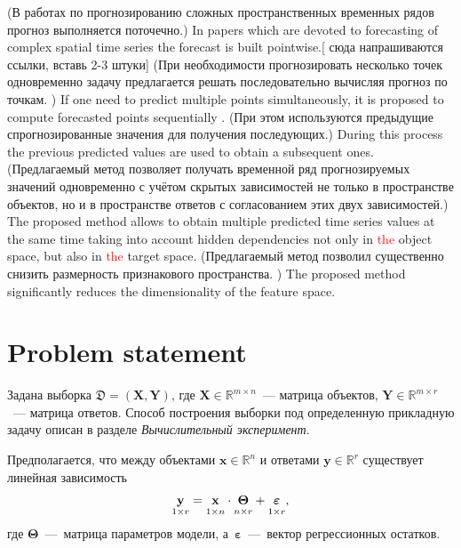 \documentclass[12pt,twoside]{article}
\newcommand{\bx}{\mathbf{x}}
\newcommand{\by}{\mathbf{y}}
\newcommand{\bY}{\mathbf{Y}}
\newcommand{\bX}{\mathbf{X}}
\newcommand{\bTheta}{\boldsymbol{\Theta}}
\begin{document}
(В работах по прогнозированию сложных пространственных временных рядов прогноз выполняется поточечно.)
In papers which are devoted to forecasting of complex spatial time series the forecast is built pointwise.[{\color{red} сюда напрашиваются ссылки, вставь 2-3 штуки}]
(При необходимости прогнозировать несколько точек одновременно задачу предлагается решать последовательно вычисляя прогноз по точкам. )
If one need to predict multiple points simultaneously, it is proposed to compute forecasted points sequentially .
(При этом используются предыдущие спрогнозированные значения для получения последующих.)
During this process the previous predicted values are used to obtain a subsequent ones.
(Предлагаемый метод позволяет получать временной ряд прогнозируемых значений одновременно с учётом скрытых зависимостей не только в пространстве объектов, но и в пространстве ответов с согласованием этих двух зависимостей.)
The proposed method allows to obtain multiple predicted time series values at the same time taking into account hidden dependencies not only in \textcolor{red}{the} object space, but also in \textcolor{red}{the} target space.
(Предлагаемый метод позволил существенно снизить размерность признакового пространства. )
The proposed method significantly reduces the dimensionality of the feature space.
 

\section{Problem statement}
Задана выборка $\mathfrak{D}= \left( \bX, \bY \right)$, где $\mathbf{X} \in \mathbb{R}^{m \times n}$~--- матрица объектов, $\mathbf{Y} \in \mathbb{R}^{m \times r}$~--- матрица ответов. 
Способ построения выборки под определенную прикладную задачу описан в разделе \textit{Вычислительный эксперимент}.

Предполагается, что между объектами $\bx \in \mathbb{R}^n$ и ответами $\by \in \mathbb{R}^r$ существует линейная зависимость 
\begin{equation}
 \underset{1 \times r}{\by} = \underset{1 \times n}{\vphantom{\by}\bx} \cdot \underset{n \times r}{\vphantom{\by}\bTheta} + \underset{1 \times r}{\vphantom{\by}\boldsymbol{\varepsilon}}, 
\label{eq::model}
\end{equation}
где $\bTheta$~---~матрица параметров модели, а~$\boldsymbol{\varepsilon}$~---~вектор регрессионных остатков.
\end{document}
